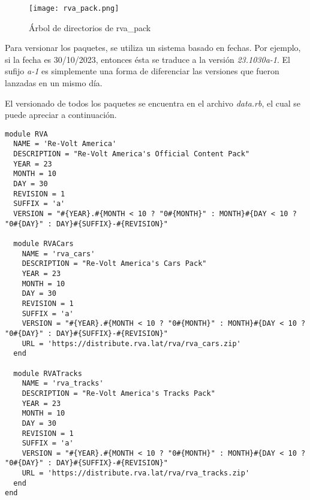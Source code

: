 \begin{figure}[H]
  \begin{center}
    \texttt{[image: rva\_pack.png]}
  \end{center}
  \caption[Árbol de directorios de rva\_pack]{Árbol de directorios de rva\_pack}
  \label{fig:rva_pack.png}
\end{figure}

Para versionar los paquetes, se utiliza un sistema basado en fechas. Por ejemplo, si la fecha es 30/10/2023, entonces ésta se traduce a la versión \textit{23.1030a-1}. El sufijo \textit{a-1} es simplemente una forma de diferenciar las versiones que fueron lanzadas en un mismo día.

\newpage

El versionado de todos los paquetes se encuentra en el archivo \textit{data.rb}, el cual se puede apreciar a continuación.

\begin{longlisting}
  \begin{verbatim}  
module RVA
  NAME = 'Re-Volt America'
  DESCRIPTION = "Re-Volt America's Official Content Pack"
  YEAR = 23
  MONTH = 10
  DAY = 30
  REVISION = 1
  SUFFIX = 'a'
  VERSION = "#{YEAR}.#{MONTH < 10 ? "0#{MONTH}" : MONTH}#{DAY < 10 ? "0#{DAY}" : DAY}#{SUFFIX}-#{REVISION}"
  
  module RVACars
    NAME = 'rva_cars'
    DESCRIPTION = "Re-Volt America's Cars Pack"
    YEAR = 23
    MONTH = 10
    DAY = 30
    REVISION = 1
    SUFFIX = 'a'
    VERSION = "#{YEAR}.#{MONTH < 10 ? "0#{MONTH}" : MONTH}#{DAY < 10 ? "0#{DAY}" : DAY}#{SUFFIX}-#{REVISION}"
    URL = 'https://distribute.rva.lat/rva/rva_cars.zip'
  end
  
  module RVATracks
    NAME = 'rva_tracks'
    DESCRIPTION = "Re-Volt America's Tracks Pack"
    YEAR = 23
    MONTH = 10
    DAY = 30
    REVISION = 1
    SUFFIX = 'a'
    VERSION = "#{YEAR}.#{MONTH < 10 ? "0#{MONTH}" : MONTH}#{DAY < 10 ? "0#{DAY}" : DAY}#{SUFFIX}-#{REVISION}"
    URL = 'https://distribute.rva.lat/rva/rva_tracks.zip'
  end
end
  \end{verbatim}
\end{longlisting}

\newpage

